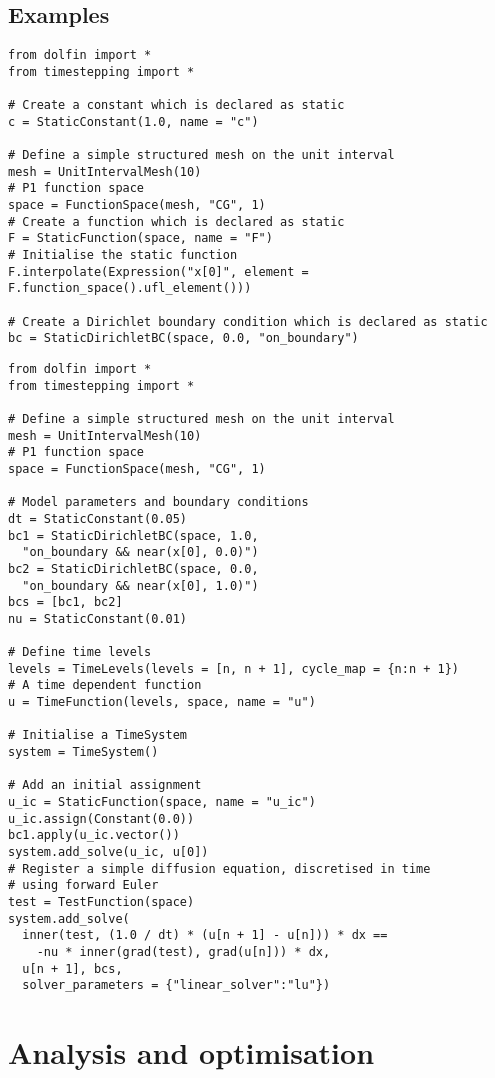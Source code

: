 \documentclass[a4paper]{book}
\begin{document}
\subsection*{Examples}

\begin{lstlisting}
from dolfin import *
from timestepping import *

# Create a constant which is declared as static
c = StaticConstant(1.0, name = "c")

# Define a simple structured mesh on the unit interval
mesh = UnitIntervalMesh(10)
# P1 function space
space = FunctionSpace(mesh, "CG", 1)
# Create a function which is declared as static
F = StaticFunction(space, name = "F")
# Initialise the static function
F.interpolate(Expression("x[0]", element = F.function_space().ufl_element()))

# Create a Dirichlet boundary condition which is declared as static
bc = StaticDirichletBC(space, 0.0, "on_boundary")
\end{lstlisting}

\begin{lstlisting}
from dolfin import *
from timestepping import *

# Define a simple structured mesh on the unit interval
mesh = UnitIntervalMesh(10)
# P1 function space
space = FunctionSpace(mesh, "CG", 1)

# Model parameters and boundary conditions
dt = StaticConstant(0.05)
bc1 = StaticDirichletBC(space, 1.0,
  "on_boundary && near(x[0], 0.0)")
bc2 = StaticDirichletBC(space, 0.0,
  "on_boundary && near(x[0], 1.0)")
bcs = [bc1, bc2]
nu = StaticConstant(0.01)

# Define time levels
levels = TimeLevels(levels = [n, n + 1], cycle_map = {n:n + 1})
# A time dependent function
u = TimeFunction(levels, space, name = "u")

# Initialise a TimeSystem
system = TimeSystem()

# Add an initial assignment
u_ic = StaticFunction(space, name = "u_ic")
u_ic.assign(Constant(0.0))
bc1.apply(u_ic.vector())
system.add_solve(u_ic, u[0])
# Register a simple diffusion equation, discretised in time
# using forward Euler
test = TestFunction(space)
system.add_solve(
  inner(test, (1.0 / dt) * (u[n + 1] - u[n])) * dx ==
    -nu * inner(grad(test), grad(u[n])) * dx,
  u[n + 1], bcs,
  solver_parameters = {"linear_solver":"lu"})
\end{lstlisting}

\section{Analysis and optimisation}\label{sect:assembly}
\end{document}
